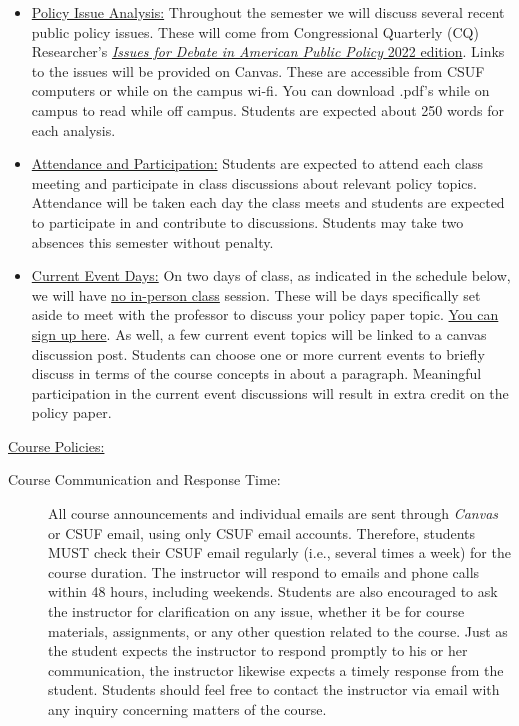 \documentclass[11pt]{article}
\begin{document}
\begin{description}
\begin{itemize}
	\item \underline{Policy Issue Analysis:} Throughout the semester we will discuss several recent public policy issues. These will come from Congressional Quarterly (CQ) Researcher's \href{https://library.cqpress.com/cqresearcher/toc.php?mode=cqres-date&level=2&values=2022}{\emph{Issues for Debate in American Public Policy} 2022 edition}. Links to the issues will be provided on Canvas. These are accessible from CSUF computers or while on the campus wi-fi. You can download .pdf's while on campus to read while off campus. Students are expected about 250 words for each analysis.  
	
	\item \underline{Attendance and Participation:} Students are expected to attend each class meeting and participate in class discussions about relevant policy topics. Attendance will be taken each day the class meets and students are expected to participate in and contribute to discussions. Students may take two absences this semester without penalty. 
	
	\item \underline{Current Event Days:} On two days of class, as indicated in the schedule below, we will have \underline{no in-person class} session. These will be days specifically set aside to meet with the professor to discuss your policy paper topic. \href{https://outlook.office.com/bookwithme/user/48008ba4b4ee4cb7bf1a0ba4fb62ae1a@Fullerton.edu?anonymous&ep=plink}{You can sign up here}. As well, a few current event topics will be linked to a canvas discussion post. Students can choose one or more current events to briefly discuss in terms of the course concepts in about a paragraph. Meaningful participation in the current event discussions will result in extra credit on the policy paper.

	
\end{itemize}

\item \underline{Course Policies:}

	\begin{description}
	
	\item[Course Communication and Response Time:] All course announcements and individual emails are sent through \emph{Canvas} or CSUF email, using only CSUF email accounts. Therefore, students MUST check their CSUF email regularly (i.e., several times a week) for the course duration. The instructor will respond to emails and phone calls within 48 hours, including weekends. Students are also encouraged to ask the instructor for clarification on any issue, whether it be for course materials, assignments, or any other question related to the course. Just as the student expects the instructor to respond promptly to his or her communication, the instructor likewise expects a timely response from the student. Students should feel free to contact the instructor via email with any inquiry concerning matters of the course.
	

\end{description}
\end{description}
\end{document}
